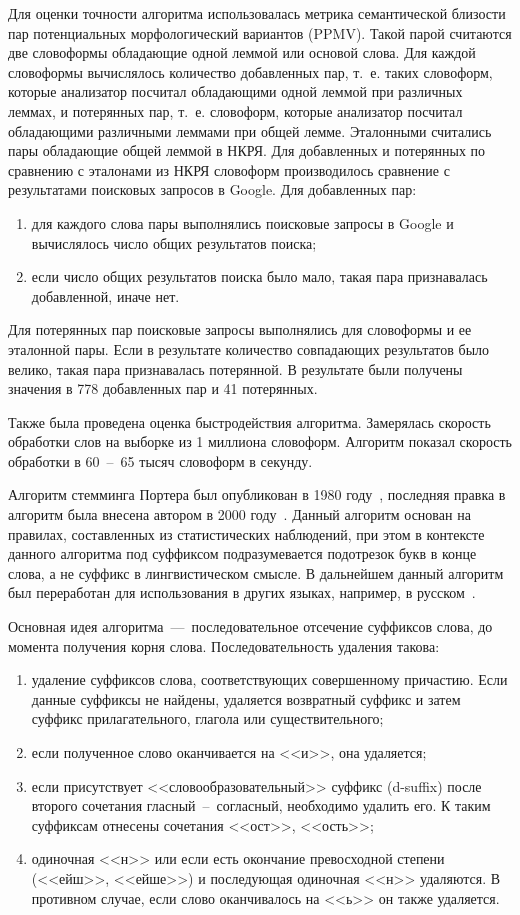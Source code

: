 Для оценки точности алгоритма использовалась метрика семантической близости пар потенциальных морфологический вариантов (PPMV). Такой парой считаются две словоформы обладающие одной леммой или основой слова. Для каждой словоформы вычислялось количество добавленных пар, т.~е. таких словоформ, которые анализатор посчитал обладающими одной леммой при различных леммах, и потерянных пар, т.~е. словоформ, которые анализатор посчитал обладающими различными леммами при общей лемме. Эталонными считались пары обладающие общей леммой в НКРЯ. Для добавленных и потерянных по сравнению с эталонами из НКРЯ словоформ производилось сравнение с результатами поисковых запросов в Google. Для добавленных пар:
\begin{enumerate}
	\item для каждого слова пары выполнялись поисковые запросы в Google и вычислялось число общих результатов поиска;
	\item если число общих результатов поиска было мало, такая пара признавалась добавленной, иначе нет.
\end{enumerate} 
Для потерянных пар поисковые запросы выполнялись для словоформы и ее эталонной пары. Если в результате количество совпадающих результатов было велико, такая пара признавалась потерянной. В результате были получены значения в 778 добавленных пар и 41 потерянных. 

Также была проведена оценка быстродействия алгоритма. Замерялась скорость обработки слов на выборке из 1 миллиона словоформ. Алгоритм показал скорость обработки в 60~--~65 тысяч словоформ в секунду.

Алгоритм стемминга Портера был опубликован в 1980 году~\cite{Porter1980}, последняя правка в алгоритм была внесена автором в 2000 году~\cite{PorterStemmer2001}. Данный алгоритм основан на правилах, составленных из статистических наблюдений, при этом в контексте данного алгоритма под суффиксом подразумевается подотрезок букв в конце слова, а не суффикс в лингвистическом смысле. В дальнейшем данный алгоритм был переработан для использования в других языках, например, в русском~\cite{SnowballRussian2003}.

Основная идея алгоритма~---~последовательное отсечение суффиксов слова, до момента получения корня слова. Последовательность удаления такова:
\begin{enumerate}
	\item удаление суффиксов слова, соответствующих совершенному причастию. Если данные суффиксы не найдены, удаляется возвратный суффикс и затем суффикс прилагательного, глагола или существительного;
	\item если полученное слово оканчивается на <<и>>, она удаляется;
	\item если присутствует <<словообразовательный>> суффикс (d-suffix) после второго сочетания гласный~--~согласный, необходимо удалить его. К таким суффиксам отнесены сочетания <<ост>>, <<ость>>;
	\item одиночная <<н>> или если есть окончание превосходной степени (<<ейш>>, <<ейше>>) и последующая одиночная <<н>> удаляются. В противном случае, если слово оканчивалось на <<ь>> он также удаляется. 
\end{enumerate}

